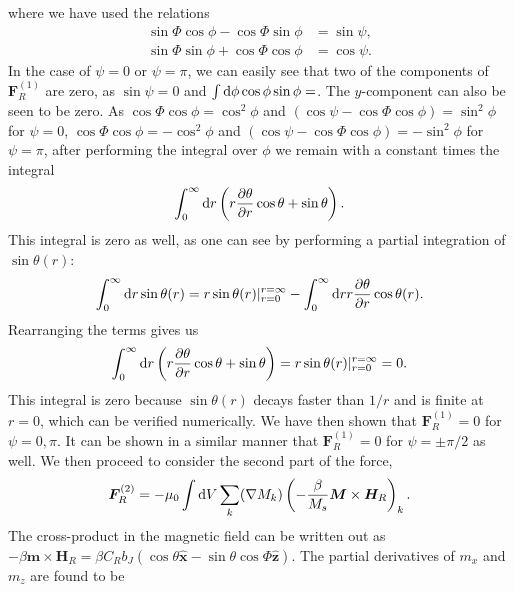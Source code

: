 where we have used the relations
\begin{subequations}
\begin{align}
    \sin\Phi\cos\phi-\cos\Phi\sin\phi &= \sin\psi, \\
    \sin\Phi\sin\phi+\cos\Phi\cos\phi &= \cos\psi.
\end{align}
\end{subequations}
In the case of $\psi = 0$ or $\psi=\pi$, we can easily see that two of the components of $\mathbold{F}_R^{(1)}$ are zero, as $\sin\psi=0$ and $\int\operatorname{d}\!{\phi} \cos\phi\sin\phi = $. The $y$-component can also be seen to be zero. As $\cos\Phi\cos\phi = \cos^2\phi$ and $(\cos\psi-\cos\Phi\cos\phi) = \sin^2\phi$ for $\psi = 0$, $\cos\Phi\cos\phi = -\cos^2\phi$ and $(\cos\psi-\cos\Phi\cos\phi) = -\sin^2\phi$ for $\psi = \pi$, after performing the integral over $\phi$ we remain with a constant times the integral 
\begin{align}
\int_0^{\infty} \operatorname{d}\!{r} \left(r\frac{\partial \theta}{\partial r}\cos\theta + \sin\theta\right).
\end{align}
This integral is zero as well, as one can see by performing a partial integration of $\sin\theta(r)$:
\begin{align}
\int_0^{\infty} \operatorname{d}\!{r} \sin\theta(r) = r\sin\theta(r)|_{r = 0}^{r=\infty} - \int_0^{\infty} \operatorname{d}\!{r} r \frac{\partial \theta}{\partial r} \cos\theta(r).
\end{align}
Rearranging the terms gives us
\begin{align}
\int_0^{\infty} \operatorname{d}\!{r} \left(r\frac{\partial \theta}{\partial r}\cos\theta + \sin\theta\right) = r\sin\theta(r)|_{r = 0}^{r=\infty} = 0.
\end{align}
This integral is zero because $\sin\theta(r)$ decays faster than $1/r$ and is finite at $r=0$, which can be verified numerically. We have then shown that $\mathbold{F}_R^{(1)} = 0$ for $\psi = 0, \pi$. It can be shown in a similar manner that $\mathbold{F}_R^{(1)} = 0$ for $\psi=\pm\pi/2$ as well. We then proceed to consider the second part of the force,
\begin{align}
    \mathbold{F}_R^{(2)} = -\mu_0\int\d V\sum_k(\mathbold{\nabla}M_k)\left(-\frac{\beta}{M_s}\mathbold{M}\times\mathbold{H}_R\right)_k.
    \label{eq:FR2}
\end{align}
The cross-product in the magnetic field can be written out as $-\beta\mathbold{m}\times\mathbold{H}_R = \beta C_R b_J ( \cos\theta \mathbold{\hat{x}} - \sin\theta\cos\Phi\mathbold{\hat{z}} )$. The partial derivatives of $m_x$ and $m_z$ are found to be

